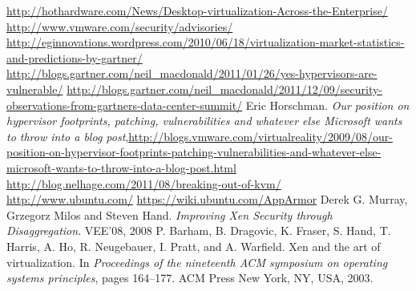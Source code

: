 {}
\begin{thebibliography}{99}
 \url{http://hothardware.com/News/Desktop-virtualization-Across-the-Enterprise/}
 \url{http://www.vmware.com/security/advisories/}
\bibitem{} \url{http://eginnovations.wordpress.com/2010/06/18/virtualization-market-statistics-and-predictions-by-gartner/}
 \url{http://blogs.gartner.com/neil\_macdonald/2011/01/26/yes-hypervisors-are-vulnerable/}
\bibitem{}
\url{http://blogs.gartner.com/neil\_macdonald/2011/12/09/security-observations-from-gartners-data-center-summit/}
 Eric Horschman. \emph{Our position on hypervisor
footprints, patching, vulnerabilities and whatever else Microsoft wants to throw
into a blog post},\url{http://blogs.vmware.com/virtualreality/2009/08/our-position-on-hypervisor-footprints-patching-vulnerabilities-and-whatever-else-microsoft-wants-to-throw-into-a-blog-post.html}
 \url{http://blog.nelhage.com/2011/08/breaking-out-of-kvm/}
 \url{http://www.ubuntu.com/}
 \url{https://wiki.ubuntu.com/AppArmor}
 Derek G. Murray, Grzegorz Milos and Steven Hand.
\emph{Improving Xen Security through Disaggregation}. VEE’08, 2008
 P. Barham, B. Dragovic, K. Fraser, S. Hand, T. Harris, A. Ho, R.
Neugebauer, I. Pratt, and A. Warfield. Xen and the art of virtualization. In
\emph{Proceedings of the nineteenth ACM symposium on operating systems
principles}, pages 164–177. ACM Press New York, NY, USA, 2003.
\end{thebibliography}
